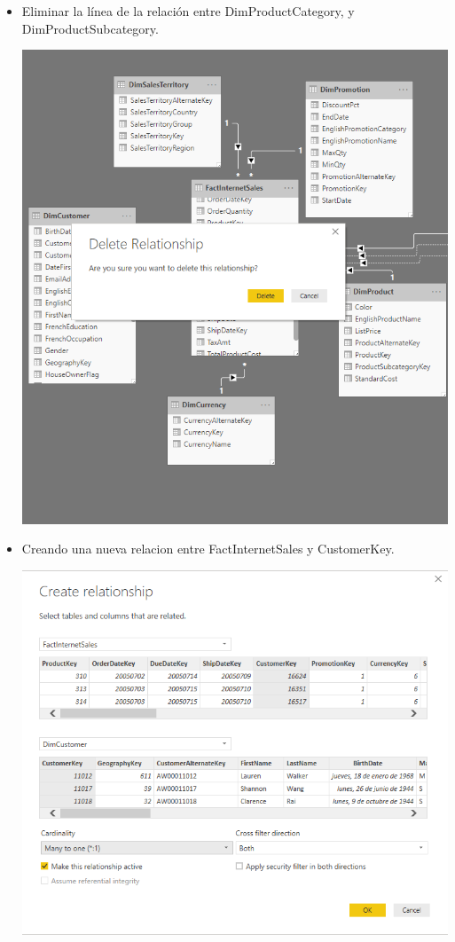 \begin{itemize}
	\item Eliminar la línea de la relación entre DimProductCategory, y DimProductSubcategory.
	\begin{center}
	\includegraphics[width=13cm]{./Imagenes/Captura7} 
	\end{center}
\end{itemize} 
\begin{itemize}
	\item Creando una nueva relacion entre FactInternetSales y CustomerKey.
	\begin{center}
	\includegraphics[width=13cm]{./Imagenes/Captura8} 
	\end{center}
\end{itemize} 


